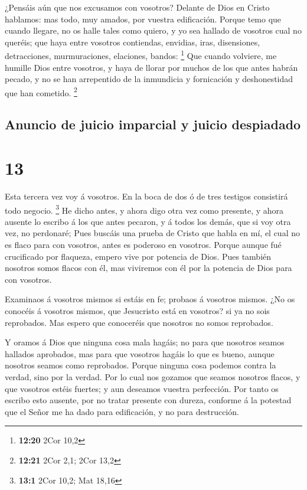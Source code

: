  ¿Pensáis aún que nos excusamos con vosotros? Delante de
Dios en Cristo hablamos: mas todo, muy amados, por vuestra edificación.
 Porque temo que cuando llegare, no os halle tales como
quiero, y yo sea hallado de vosotros cual no queréis; que haya entre
vosotros contiendas, envidias, iras, disensiones, detracciones,
murmuraciones, elaciones, bandos: \footnote{\textbf{12:20} 2Cor 10,2}
 Que cuando volviere, me humille Dios entre vosotros, y
haya de llorar por muchos de los que antes habrán pecado, y no se han
arrepentido de la inmundicia y fornicación y deshonestidad que han
cometido. \footnote{\textbf{12:21} 2Cor 2,1; 2Cor 13,2}

\hypertarget{anuncio-de-juicio-imparcial-y-juicio-despiadado}{%
\subsection{Anuncio de juicio imparcial y juicio
despiadado}\label{anuncio-de-juicio-imparcial-y-juicio-despiadado}}

\hypertarget{section-12}{%
\section{13}\label{section-12}}

 Esta tercera vez voy á vosotros. En la boca de dos ó de
tres testigos consistirá todo negocio. \footnote{\textbf{13:1} 2Cor
  10,2; Mat 18,16}  He dicho antes, y ahora digo otra vez
como presente, y ahora ausente lo escribo á los que antes pecaron, y á
todos los demás, que si voy otra vez, no perdonaré;  Pues
buscáis una prueba de Cristo que habla en mí, el cual no es flaco para
con vosotros, antes es poderoso en vosotros.  Porque aunque
fué crucificado por flaqueza, empero vive por potencia de Dios. Pues
también nosotros somos flacos con él, mas viviremos con él por la
potencia de Dios para con vosotros.

 Examinaos á vosotros mismos si estáis en fe; probaos á
vosotros mismos. ¿No os conocéis á vosotros mismos, que Jesucristo está
en vosotros? si ya no sois reprobados.  Mas espero que
conoceréis que nosotros no somos reprobados.

 Y oramos á Dios que ninguna cosa mala hagáis; no para que
nosotros seamos hallados aprobados, mas para que vosotros hagáis lo que
es bueno, aunque nosotros seamos como reprobados.  Porque
ninguna cosa podemos contra la verdad, sino por la verdad. 
Por lo cual nos gozamos que seamos nosotros flacos, y que vosotros
estéis fuertes; y aun deseamos vuestra perfección.  Por
tanto os escribo esto ausente, por no tratar presente con dureza,
conforme á la potestad que el Señor me ha dado para edificación, y no
para destrucción.

